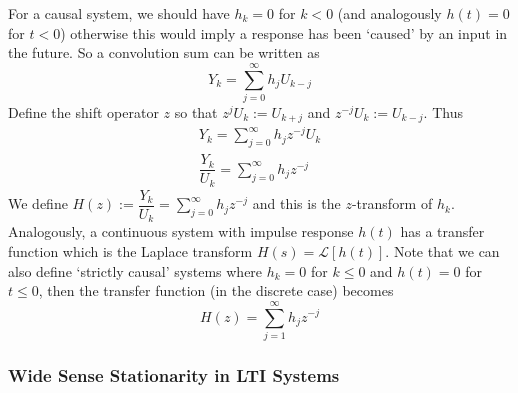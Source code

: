 \documentclass[11pt]{report} %
\begin{document}
For a causal system, we should have $h_{k} = 0$ for $k < 0$ (and analogously $h\left(t\right) = 0$ for $t < 0$) otherwise this would imply a response has been `caused' by an input in the future. So a convolution sum can be written as
\begin{equation}
Y_{k} = \sum_{j = 0}^{\infty}h_{j}U_{k - j}
\end{equation}
Define the shift operator $z$ so that $z^{j}U_{k} := U_{k + j}$ and $z^{-j}U_{k} := U_{k - j}$. Thus
\begin{gather}
Y_{k} = \sum_{j = 0}^{\infty}h_{j}z^{-j}U_{k} \\
\dfrac{Y_{k}}{U_{k}} = \sum_{j = 0}^{\infty}h_{j}z^{-j}
\end{gather}
We define $H\left(z\right) := \dfrac{Y_{k}}{U_{k}} = \sum_{j = 0}^{\infty}h_{j}z^{-j}$ and this is the $z$-transform of $h_{k}$. Analogously, a continuous system with impulse response $h\left(t\right)$ has a transfer function which is the Laplace transform $H\left(s\right) = \mathcal{L}\left[h\left(t\right)\right]$. Note that we can also define `strictly causal' systems where $h_{k} = 0$ for $k \leq 0$ and $h\left(t\right) = 0$ for $t \leq 0$, then the transfer function (in the discrete case) becomes
\begin{equation}
H\left(z\right) = \sum_{j = 1}^{\infty}h_{j}z^{-j}
\end{equation}

\subsubsection{Wide Sense Stationarity in LTI Systems}
\end{document}
